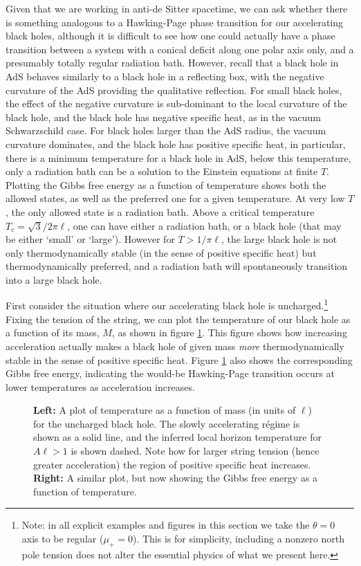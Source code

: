 \documentclass[
twoside,openright,frontopenright]{dmathesis}
\begin{document}
Given that we are working in anti-de Sitter spacetime, we can ask whether there
is something analogous to a Hawking-Page phase transition \cite{Hawking:1982dh}
for our accelerating black holes, although it is difficult to see how one could
actually have a phase transition between a system with a conical deficit along
one polar axis only, and a presumably totally regular radiation bath.  However,
recall that a black hole in AdS behaves similarly to a black hole in a
reflecting box, with the negative curvature of the AdS providing the qualitative
reflection. For small black holes, the effect of the negative curvature is
sub-dominant to the local curvature of the black hole, and the black hole has
negative specific heat, as in the vacuum Schwarzschild case. For black holes
larger than the AdS radius, the vacuum curvature dominates, and the black hole
has positive specific heat, in particular, there is a minimum temperature for a
black hole in AdS, below this temperature, only a radiation bath can be a
solution to the Einstein equations at finite $T$. Plotting the Gibbs free energy
as a function of temperature shows both the allowed states, as well as the
preferred one for a given temperature.  At very low $T$, the only allowed state
is a radiation bath. Above a critical temperature $T_c = \sqrt{3}/2\pi\ell$, one
can have either a radiation bath, or a black hole (that may be either `small' or
`large'). However for $T>1/\pi\ell$, the large black hole is not only
thermodynamically stable (in the sense of positive specific heat) but
thermodynamically preferred, and a radiation bath will spontaneously transition
into a large black hole.

First consider the situation where our accelerating black hole is
uncharged.\footnote{ Note: in all explicit examples and figures in this section
  we take the $\theta=0$ axis to be regular ($\mu_+=0$). This is for simplicity,
  including a nonzero north pole tension does not alter the essential physics of
  what we present here.}  Fixing the tension of the string, we can plot the
temperature of our black hole as a function of its mass, $M$, as shown in figure
\ref{fig:TvMnocharge}.  This figure shows how increasing acceleration actually
makes a black hole of given mass {\it more} thermodynamically stable in the
sense of positive specific heat. Figure \ref{fig:TvMnocharge} also shows the
corresponding Gibbs free energy, indicating the would-be Hawking-Page transition
occurs at lower temperatures as acceleration increases.
\begin{figure}
\caption{{\bf Left:} A plot of temperature as a function of mass (in units of
  $\ell$) for the uncharged black hole.  The slowly accelerating r\'egime is
  shown as a solid line, and the inferred local horizon temperature for
  $A\ell>1$ is shown dashed. Note how for larger string tension (hence greater
  acceleration) the region of positive specific heat increases. {\bf Right:} A
  similar plot, but now showing the Gibbs free energy as a function of
  temperature.  }
\label{fig:TvMnocharge}
\end{figure}
\end{document}
